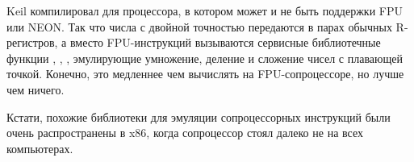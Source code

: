 

Keil компилировал для процессора, в котором может и не быть поддержки FPU или NEON. 
Так что числа с двойной точностью передаются в парах обычных R-регистров, 
а вместо FPU-инструкций вызываются сервисные
библиотечные функции , , , эмулирующие 
умножение, деление и сложение чисел с плавающей точкой. 
Конечно, это медленнее чем вычислять на FPU-сопроцессоре, но лучше чем ничего.

Кстати, похожие библиотеки для эмуляции сопроцессорных инструкций были очень распространены в x86, 
когда сопроцессор стоял далеко не на всех компьютерах.

